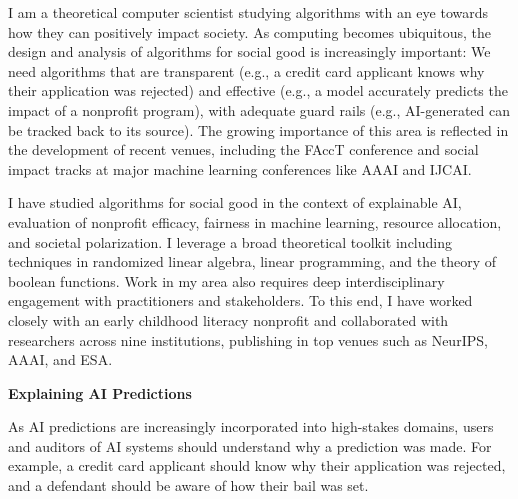 \documentclass[11pt]{article}
\begin{document}
{\setlength{\parindent}{0cm}

I am a theoretical computer scientist studying algorithms with an eye towards how they can positively impact society. As computing becomes ubiquitous, the design and analysis of algorithms for social good is increasingly important: We need algorithms that are transparent (e.g., a credit card applicant knows why their application was rejected) and
effective (e.g., a model accurately predicts the impact of a nonprofit program), with adequate guard rails (e.g., AI-generated can be tracked back to its source).
The growing importance of this area is reflected in the development of recent venues, including the FAccT conference and social impact tracks at major machine learning conferences like AAAI and IJCAI.

I have studied algorithms for social good in the context of explainable AI, evaluation of nonprofit efficacy, fairness in machine learning, resource allocation, and societal polarization. I leverage a broad theoretical toolkit including techniques in randomized linear algebra, linear programming, and the theory of boolean functions. Work in my area also requires deep interdisciplinary engagement with practitioners and stakeholders. To this end, I have worked closely with an early childhood literacy nonprofit and collaborated with researchers across nine institutions, publishing in top venues such as NeurIPS, AAAI, and ESA.

%

{ \large \textbf{Explaining AI Predictions}}

As AI predictions are increasingly incorporated into high-stakes domains, users and auditors of AI systems should understand why a prediction was made. For example, a credit card applicant should know why their application was rejected, and a defendant should be aware of how their bail was set. 

}
\end{document}
